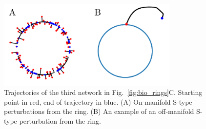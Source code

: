 \documentclass{article} %
\newcounter{ct}
\theoremstyle{definition}
\theoremstyle{remark}
\begin{document}
\begin{figure}[h]
\centering
\includegraphics[width=0.8\textwidth]{empj_onoff_perturbation}
\caption{Trajectories of the third network in Fig.~\ref{fig:bio_rings}C. Starting point in red, end of trajectory in blue.
(A) On-manifold S-type perturbations from the ring.
(B) An example of an off-manifold  S-type perturbation from the ring.
}\label{fig:empj_onoff_perturbation}
\end{figure}







%
%
%
%
\end{document}

